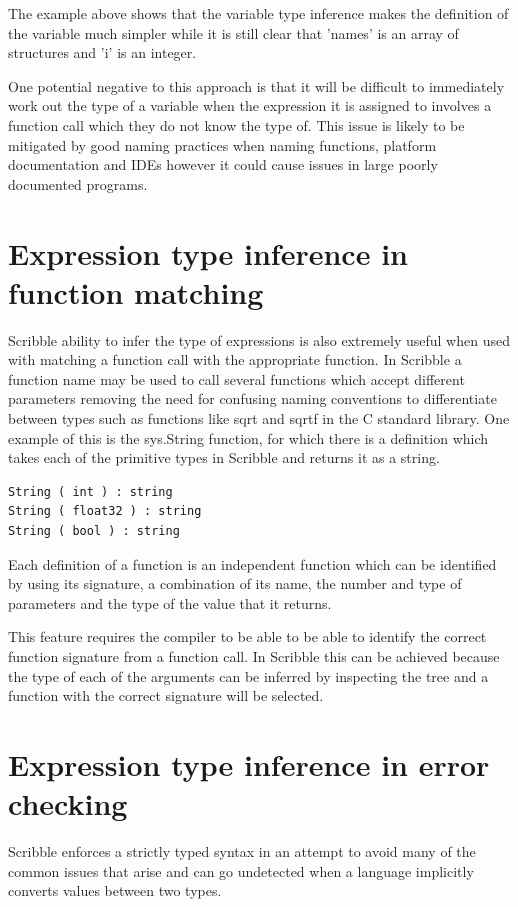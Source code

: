 \documentclass[]{final_report}
\begin{document}
The example above shows that the variable type inference makes the definition of the variable much simpler while it is still clear that 'names' is an array of structures and 'i' is an integer.

One potential negative to this approach is that it will be difficult to immediately work out the type of a variable when the expression it is assigned to involves a function call which they do not know the type of. This issue is likely to be mitigated by good naming practices when naming functions, platform documentation and IDEs however it could cause issues in large poorly documented programs.

\section{Expression type inference in function matching}

Scribble ability to infer the type of expressions is also extremely useful when used with matching a function call with the appropriate function. In Scribble a function name may be used to call several functions which accept different parameters removing the need for confusing naming conventions to differentiate between types such as functions like sqrt and sqrtf in the C standard library. One example of this is the sys.String function, for which there is a definition which takes each of the primitive types in Scribble and returns it as a string.

\begin{verbatim}
String ( int ) : string
String ( float32 ) : string
String ( bool ) : string
\end{verbatim}

Each definition of a function is an independent function which can be identified by using its signature, a combination of its name, the number and type of parameters and the type of the value that it returns.

This feature requires the compiler to be able to be able to identify the correct function signature from a function call. In Scribble this can be achieved because the type of each of the arguments can be inferred by inspecting the tree and a function with the correct signature will be selected.

\section{Expression type inference in error checking}

Scribble enforces a strictly typed syntax in an attempt to avoid many of the common issues that arise and can go undetected when a language implicitly converts values between two types.
\end{document}
